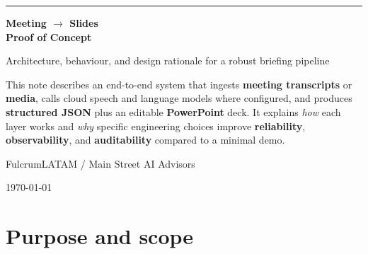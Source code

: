 \documentclass[11pt,a4paper]{article}
\newcommand{\DocumentTitle}{Meeting $\rightarrow$ Slides\\[0.35em]\Large Proof of Concept}
\newcommand{\DocumentSubtitle}{Architecture, behaviour, and design rationale for a robust briefing pipeline}
\begin{document}
\begin{titlepage}
  \centering
  \vspace*{1.2cm}
  {\color{BrandTeal}\rule{0.35\textwidth}{4pt}}\par\vspace{1em}
  {\LARGE\bfseries\color{BrandSlate}\DocumentTitle\par}
  \vspace{0.8em}
  {\large\color{BrandSlate!80}\DocumentSubtitle\par}
  \vspace{2.2cm}
  \begin{tcolorbox}[width=0.88\textwidth,colback=BrandSlate!4,colframe=BrandTeal!50,arc=4pt,title={\textbf{Document abstract}}]
    This note describes an end-to-end system that ingests \textbf{meeting transcripts} or \textbf{media}, calls cloud speech and language models where configured, and produces \textbf{structured JSON} plus an editable \textbf{PowerPoint} deck. It explains \emph{how} each layer works and \emph{why} specific engineering choices improve \textbf{reliability}, \textbf{observability}, and \textbf{auditability} compared to a minimal demo.
  \end{tcolorbox}
  \vfill
  {\large FulcrumLATAM / Main Street AI Advisors\par}
  \vspace{0.5em}
  {\normalsize \today\par}
  \vspace{1.2cm}
\end{titlepage}

\tableofcontents
\clearpage

\section{Purpose and scope}
\end{document}
